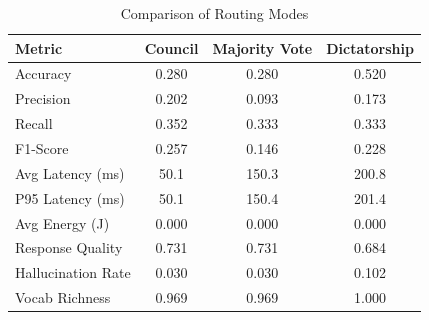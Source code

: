 \begin{table}[ht]
\centering
\caption{Comparison of Routing Modes}
\label{tab:comparison}
\begin{tabular}{lccc}
\toprule
Metric & Council & Majority Vote & Dictatorship \\
\midrule
Accuracy & 0.280 & 0.280 & 0.520 \\
Precision & 0.202 & 0.093 & 0.173 \\
Recall & 0.352 & 0.333 & 0.333 \\
F1-Score & 0.257 & 0.146 & 0.228 \\
Avg Latency (ms) & 50.1 & 150.3 & 200.8 \\
P95 Latency (ms) & 50.1 & 150.4 & 201.4 \\
Avg Energy (J) & 0.000 & 0.000 & 0.000 \\
Response Quality & 0.731 & 0.731 & 0.684 \\
Hallucination Rate & 0.030 & 0.030 & 0.102 \\
Vocab Richness & 0.969 & 0.969 & 1.000 \\
\bottomrule
\end{tabular}
\end{table}